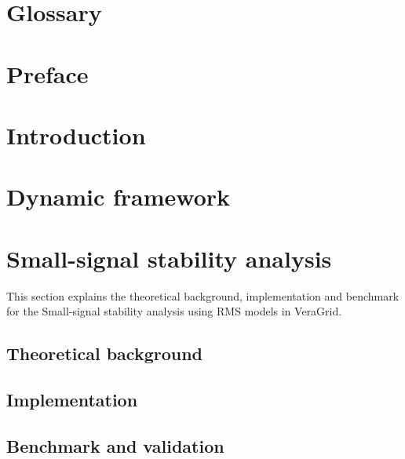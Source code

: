 \documentclass[a4paper, 11pt, titlepage, twoside]{article}
\begin{document}
\cleardoublepage

\tableofcontents

\newpage
\listoffigures

\newpage
\begingroup
\setlength{\parskip}{0pt}
\listoftables %
\endgroup

\setlength{\abovedisplayskip}{5pt} %
\setlength{\belowdisplayskip}{5pt} %

\newpage
\section*{Glossary}

\newpage

\section*{Preface}

\newpage

\section{Introduction}\label{Introduction}

\newpage

\section{Dynamic framework}\label{dynamic}

\newpage

\section{Small-signal stability analysis}\label{SmallSignal}
This section explains the theoretical background, implementation and benchmark for the Small-signal stability analysis
using RMS models in VeraGrid.
\subsection{Theoretical background}

\subsection{Implementation}

\subsection{Benchmark and validation}

\newpage
\end{document}
